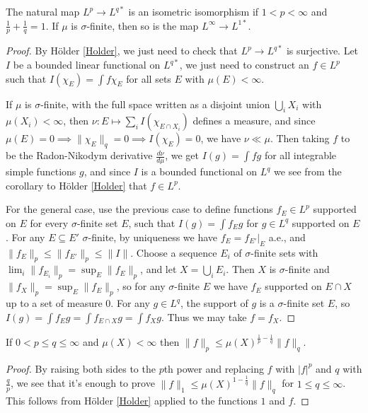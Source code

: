 \documentclass[letterpaper,11pt]{report}
\begin{document}
\begin{thm} The natural map $L^p \rightarrow L^{q*}$ is an isometric isomorphism if $1 < p < \infty$ and $\frac{1}{p} + \frac{1}{q} = 1$. If $\mu$ is $\sigma$-finite, then so is the map $L^\infty \rightarrow L^{1*}$.
\end{thm}
\begin{proof} By H\"older \ref{Holder}, we just need to check that $L^p \rightarrow L^{q*}$ is surjective. Let $I$ be a bounded linear functional on $L^{q*}$, we just need to construct an $f \in L^p$ such that $I(\chi_E) = \int f\chi_E$ for all sets $E$ with $\mu(E) < \infty$.

If $\mu$ is $\sigma$-finite, with the full space written as a disjoint union $\bigcup_i X_i$ with $\mu(X_i) < \infty$, then $\nu : E \mapsto \sum_i I(\chi_{E\cap X_i})$ defines a measure, and since $\mu(E) = 0 \implies \|\chi_E\|_q = 0 \implies I(\chi_E) = 0$, we have $\nu \ll \mu$. Then taking $f$ to be the Radon-Nikodym derivative $\frac{d\nu}{d\mu}$, we get $I(g) = \int fg$ for all integrable simple functions $g$, and since $I$ is a bounded functional on $L^q$ we see from the corollary to H\"older \ref{Holder} that $f \in L^p$.

For the general case, use the previous case to define functions $f_E \in L^p$ supported on $E$ for every $\sigma$-finite set $E$, such that $I(g) = \int f_Eg$ for $g \in L^q$ supported on $E$. For any $E \subseteq E'$ $\sigma$-finite, by uniqueness we have $f_E = f_{E'}|_E$ a.e., and $\|f_E\|_p \le \|f_{E'}\|_p \le \|I\|$. Choose a sequence $E_i$ of $\sigma$-finite sets with $\lim_i \|f_{E_i}\|_p = \sup_E \|f_E\|_p$, and let $X = \bigcup_i E_i$. Then $X$ is $\sigma$-finite and $\|f_X\|_p = \sup_E \|f_E\|_p$, so for any $\sigma$-finite $E$ we have $f_E$ supported on $E \cap X$ up to a set of measure $0$. For any $g \in L^q$, the support of $g$ is a $\sigma$-finite set $E$, so $I(g) = \int f_Eg = \int f_{E\cap X}g = \int f_Xg$. Thus we may take $f = f_X$.
\end{proof}

\begin{prop} If $0 < p \le q \le \infty$ and $\mu(X) < \infty$ then $\|f\|_p \le \mu(X)^{\frac{1}{p} - \frac{1}{q}}\|f\|_q$.
\end{prop}
\begin{proof} By raising both sides to the $p$th power and replacing $f$ with $|f|^p$ and $q$ with $\frac{q}{p}$, we see that it's enough to prove $\|f\|_1 \le \mu(X)^{1-\frac{1}{q}}\|f\|_q$ for $1 \le q \le \infty$. This follows from H\"older \ref{Holder} applied to the functions $1$ and $f$.
\end{proof}
\end{document}
